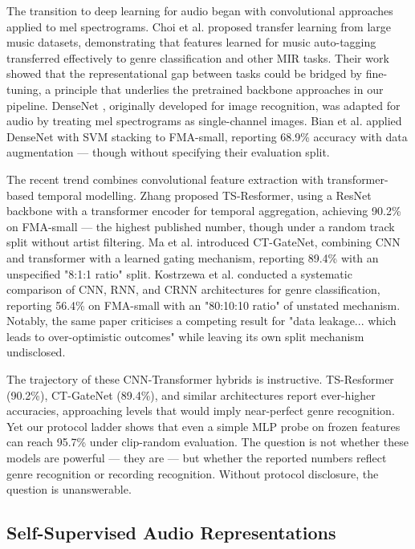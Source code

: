 \documentclass[conference]{IEEEtran}
\begin{document}
The transition to deep learning for audio began with convolutional
approaches applied to mel spectrograms. Choi et al.
\citep{choi2017transfer} proposed transfer learning from large music
datasets, demonstrating that features learned for music auto-tagging
transferred effectively to genre classification and other MIR tasks.
Their work showed that the representational gap between tasks could be
bridged by fine-tuning, a principle that underlies the pretrained
backbone approaches in our pipeline. DenseNet \citep{huang2017densenet},
originally developed for image recognition, was adapted for audio by
treating mel spectrograms as single-channel images. Bian et al.
\citep{bian2019audio} applied DenseNet with SVM stacking to FMA-small,
reporting 68.9\% accuracy with data augmentation --- though without
specifying their evaluation split.

The recent trend combines convolutional feature extraction with
transformer-based temporal modelling. Zhang \citep{zhang2025tsresformer}
proposed TS-Resformer, using a ResNet backbone with a transformer
encoder for temporal aggregation, achieving 90.2\% on FMA-small ---
the highest published number, though under a random track split without
artist filtering. Ma et al. \citep{ma2026ctgatenet} introduced
CT-GateNet, combining CNN and transformer with a learned gating
mechanism, reporting 89.4\% with an unspecified "8:1:1 ratio" split.
Kostrzewa et al. \citep{kostrzewa2021music} conducted a systematic
comparison of CNN, RNN, and CRNN architectures for genre classification,
reporting 56.4\% on FMA-small with an "80:10:10 ratio" of unstated
mechanism. Notably, the same paper criticises a competing result for
"data leakage... which leads to over-optimistic outcomes" while leaving
its own split mechanism undisclosed.

The trajectory of these CNN-Transformer hybrids is instructive.
TS-Resformer (90.2\%), CT-GateNet (89.4\%), and similar architectures
report ever-higher accuracies, approaching levels that would imply
near-perfect genre recognition. Yet our protocol ladder shows that even
a simple MLP probe on frozen features can reach 95.7\% under clip-random
evaluation. The question is not whether these models are powerful
--- they are --- but whether the reported numbers reflect genre
recognition or recording recognition. Without protocol disclosure, the
question is unanswerable.

\subsection{Self-Supervised Audio
Representations}\label{b.-self-supervised-audio-representations}
\end{document}
